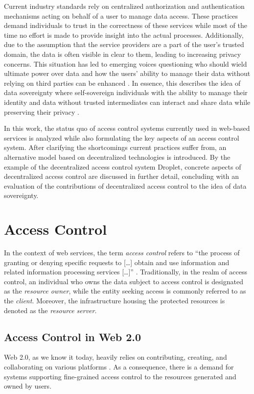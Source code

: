 \documentclass[conference]{IEEEtran}
\begin{document}
Current industry standards rely on centralized authorization and authentication mechanisms acting on behalf of a user to manage data access. \cite{hardt_oauth_2012,noauthor_googles_nodate}
These practices demand individuals to trust in the correctness of these services while most of the time no effort is made to provide insight into the actual processes.
Additionally, due to the assumption that the service providers are a part of the user's trusted domain, the data is often visible in clear to them, leading to increasing privacy concerns.
This situation has led to emerging voices questioning who should wield ultimate power over data and how the users' ability to manage their data without relying on third parties can be enhanced \cite{noauthor_w3f_nodate}.
In essence, this describes the idea of data sovereignty where self-sovereign individuals with the ability to manage their identity and data without trusted intermediates can interact and share data while preserving their privacy \cite{ernstberger_sok_2023}.

In this work, the status quo of access control systems currently used in web-based services is analyzed while also formulating the key aspects of an access control system.
After clarifying the shortcomings current practices suffer from, an alternative model based on decentralized technologies is introduced.
By the example of the decentralized access control system Droplet, concrete aspects of decentralized access control are discussed in further detail, concluding with an evaluation of the contributions of decentralized access control to the idea of data sovereignty.

\section{Access Control}
In the context of web services, the term \textit{access control} refers to \enquote{the process of granting or denying specific requests to [\dots] obtain and use information and related information processing services [\dots]} \cite{editor_access_nodate}.
Traditionally, in the realm of access control, an individual who owns the data subject to access control is designated as the \textit{resource owner}, while the entity seeking access is commonly referred to as the \textit{client}.
Moreover, the infrastructure housing the protected resources is denoted as the \textit{resource server}.

\subsection{Access Control in Web 2.0}
Web 2.0, as we know it today, heavily relies on contributing, creating, and collaborating on various platforms \cite{community_web_2019}.
As a consequence, there is a demand for systems supporting fine-grained access control to the resources generated and owned by users.
\end{document}
